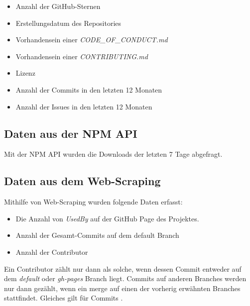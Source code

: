 \begin{itemize}[noitemsep]
    \item Anzahl der GitHub-Sternen
    \item Erstellungsdatum des Repositories
    \item Vorhandensein einer \textit{CODE\_OF\_CONDUCT.md}
    \item Vorhandensein einer \textit{CONTRIBUTING.md}
    \item Lizenz
    \item Anzahl der Commits in den letzten 12 Monaten
    \item Anzahl der Issues in den letzten 12 Monaten
\end{itemize}


\subsection{Daten aus der NPM API}
Mit der NPM API wurden die Downloads der letzten 7 Tage abgefragt.



\subsection{Daten aus dem Web-Scraping}
Mithilfe von Web-Scraping wurden folgende Daten erfasst:

\begin{itemize}[noitemsep]
    \item Die Anzahl von \textit{UsedBy} auf der GitHub Page des Projektes.
    \item Anzahl der Gesamt-Commits auf dem default Branch
    \item Anzahl der Contributor
\end{itemize}

\noindent
Ein Contributor zählt nur dann als solche, wenn dessen Commit entweder auf dem \textit{default}
oder \textit{gh-pages} Branch liegt. Commits auf anderen Branches werden nur dann gezählt, wenn ein
merge auf einen der vorherig erwähnten Branches stattfindet. Gleiches gilt für Commits \cite{GHapiDocsCommits}.

